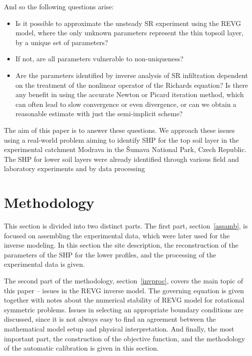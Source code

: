 \documentclass[review]{elsarticle}
\begin{document}
And so the following questions arise: 
\begin{itemize}
	\item Is it possible to approximate the unsteady SR experiment using the REVG model, where the only unknown parameters represent the thin topsoil layer, by a unique set of parameters? \
	\item If not, are all parameters vulnerable to non-uniqueness?
	\item Are the parameters identified by inverse analysis of SR infiltration dependent on the treatment of the nonlinear operator of the Richards equation? Is there any benefit in using the accurate Newton or Picard iteration method, which can often lead to slow convergence or even divergence, or can we obtain a reasonable estimate with just the semi-implicit scheme?
\end{itemize}



The aim of this paper is to answer these questions. We approach these issues using a real-world problem aiming to identify SHP for the top soil layer in the experimental catchment Modrava in the \v{S}umava National Park, Czech Republic. The SHP for lower soil layers were already identified through various field and laboratory experiments and by data processing %









\section{Methodology}%
\label{metodo}


This section is divided into two distinct parts. The first part, section~\ref{assamb}, is focused on assembling the experimental data, which were later used for the inverse modeling. In this section the site description, the reconstruction of the parameters of the SHP for the lower profiles, and the processing of the experimental data is given.   

The second part of the methodology, section~\ref{invproc}, covers the main topic of this paper --  issues in the REVG inverse model. The governing equation is given together with  notes about the numerical stability of 
REVG model for rotational symmetric problems.
Issues in selecting an appropriate boundary conditions are discussed, since it is not always easy to find an agreement between the mathematical model setup and  physical interpretation. And finally, the most important part, the construction of the objective function, and the methodology of the automatic calibration is given in this section. 
\end{document}
